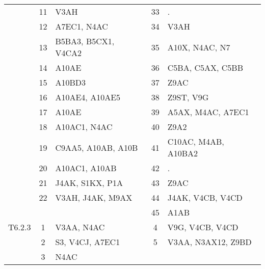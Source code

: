 \begin{table}[htbp]
\begin{tabular}{c c l c l}
	 & 11 & V3AH & 33 & . \\
	 & 12 & A7EC1, N4AC & 34 & V3AH \\
	 & 13 & B5BA3, B5CX1, V4CA2 & 35 & A10X, N4AC, N7 \\
	 & 14 & A10AE & 36 & C5BA, C5AX, C5BB \\
	 & 15 & A10BD3 & 37 & Z9AC \\
	 & 16 & A10AE4, A10AE5 & 38 & Z9ST, V9G \\
	 & 17 & A10AE & 39 & A5AX, M4AC, A7EC1 \\
	 & 18 & A10AC1, N4AC & 40 & Z9A2 \\
	 & 19 & C9AA5, A10AB, A10B & 41 & C10AC, M4AB, A10BA2 \\
	 & 20 & A10AC1, A10AB & 42 & . \\
	 & 21 & J4AK, S1KX, P1A & 43 & Z9AC \\
	 & 22 & V3AH, J4AK, M9AX & 44 & J4AK, V4CB, V4CD \\
	 & & & 45 & A1AB \\
	\addlinespace
	T6.2.3 & 1 & V3AA, N4AC & 4 & V9G, V4CB, V4CD \\
	 & 2 & S3, V4CJ, A7EC1 & 5 & V3AA, N3AX12, Z9BD \\
	 & 3 & N4AC & & \\
	\bottomrule
\end{tabular}
\end{table}


